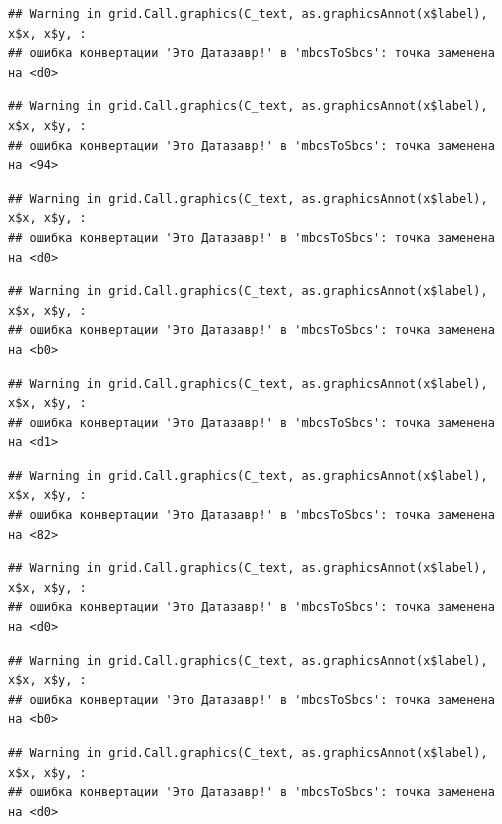 \documentclass[]{book}
\begin{document}
\begin{verbatim}
## Warning in grid.Call.graphics(C_text, as.graphicsAnnot(x$label), x$x, x$y, :
## ошибка конвертации 'Это Датазавр!' в 'mbcsToSbcs': точка заменена на <d0>
\end{verbatim}

\begin{verbatim}
## Warning in grid.Call.graphics(C_text, as.graphicsAnnot(x$label), x$x, x$y, :
## ошибка конвертации 'Это Датазавр!' в 'mbcsToSbcs': точка заменена на <94>
\end{verbatim}

\begin{verbatim}
## Warning in grid.Call.graphics(C_text, as.graphicsAnnot(x$label), x$x, x$y, :
## ошибка конвертации 'Это Датазавр!' в 'mbcsToSbcs': точка заменена на <d0>
\end{verbatim}

\begin{verbatim}
## Warning in grid.Call.graphics(C_text, as.graphicsAnnot(x$label), x$x, x$y, :
## ошибка конвертации 'Это Датазавр!' в 'mbcsToSbcs': точка заменена на <b0>
\end{verbatim}

\begin{verbatim}
## Warning in grid.Call.graphics(C_text, as.graphicsAnnot(x$label), x$x, x$y, :
## ошибка конвертации 'Это Датазавр!' в 'mbcsToSbcs': точка заменена на <d1>
\end{verbatim}

\begin{verbatim}
## Warning in grid.Call.graphics(C_text, as.graphicsAnnot(x$label), x$x, x$y, :
## ошибка конвертации 'Это Датазавр!' в 'mbcsToSbcs': точка заменена на <82>
\end{verbatim}

\begin{verbatim}
## Warning in grid.Call.graphics(C_text, as.graphicsAnnot(x$label), x$x, x$y, :
## ошибка конвертации 'Это Датазавр!' в 'mbcsToSbcs': точка заменена на <d0>
\end{verbatim}

\begin{verbatim}
## Warning in grid.Call.graphics(C_text, as.graphicsAnnot(x$label), x$x, x$y, :
## ошибка конвертации 'Это Датазавр!' в 'mbcsToSbcs': точка заменена на <b0>
\end{verbatim}

\begin{verbatim}
## Warning in grid.Call.graphics(C_text, as.graphicsAnnot(x$label), x$x, x$y, :
## ошибка конвертации 'Это Датазавр!' в 'mbcsToSbcs': точка заменена на <d0>
\end{verbatim}
\end{document}
